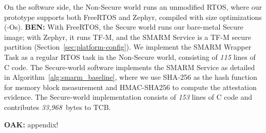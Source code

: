 \documentclass{ieeeaccess}
\DeclareRobustCommand{\oak}[1]{{\color{OAKcolor}\textbf{OAK:} #1}}
\DeclareRobustCommand{\ben}[1]{{\color{BENcolor}\textbf{BEN:} #1}}
\begin{document}
On the software side, the Non-Secure world runs an unmodified RTOS, where our prototype supports both FreeRTOS and Zephyr, compiled with size optimizations (-Os).
\ben{With FreeRTOS, the Secure world runs our bare-metal Secure image; with Zephyr, it runs TF-M, and the SMARM Service is a TF-M secure partition (Section~\ref{sec:platform-config}).}
We implement the SMARM Wrapper Task as a regular RTOS task in the Non-Secure world, consisting of \textit{115} lines of C code.
%
The Secure-world software implements the SMARM Service as detailed 
in Algorithm~\ref{alg:smarm_baseline}, where we use SHA-256 as the 
hash function for memory block measurement and HMAC-SHA256 to compute 
the attestation evidence. The Secure-world implementation consists of 
\textit{153} lines of C code and contributes \textit{33{,}968}~bytes 
to TCB.

\oak{appendix!}
\end{document}

